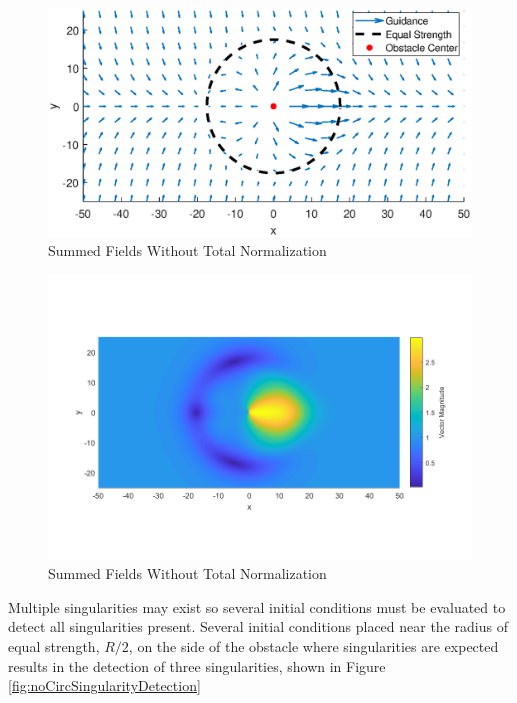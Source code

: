 \documentclass[numbered,pdftex]{ohio-etd}
\begin{document}
\begin{figure}[H]
	\centering
	\includegraphics[trim=25 35 25 50,clip,width=14cm]{PaperFigures/Methods/summedFieldsNoNorm}
	\caption{Summed Fields Without Total Normalization}
	\label{fig:summedFieldsNoNorm}
\end{figure}

\begin{figure}[H]
	\centering
	\includegraphics[trim=25 60 25 85,clip,width=14cm]{Figures/methods/summedHeatMapSimple}
	\caption{Summed Fields Without Total Normalization}
	\label{fig:summedHeatMap}
\end{figure}


Multiple singularities may exist so several initial conditions must be evaluated to detect all singularities present. Several initial conditions placed near the radius of equal strength, $R/2$, on the side of the obstacle where singularities are expected results in the detection of three singularities, shown in Figure \ref{fig:noCircSingularityDetection}
\end{document}
